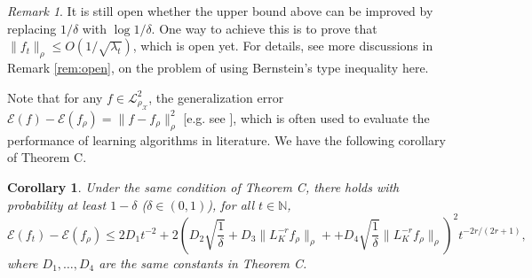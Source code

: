 \documentclass[twoside,11pt]{amsart}
\theoremstyle{theorem}
\newtheorem{cor}[thm]{Corollary}
\theoremstyle{definition}
\theoremstyle{remark}
\newtheorem{rem}[thm]{Remark}
\def\L{{\mathscr L}}
\def\L2{{\mathscr L}^2_{\rho_\X}}
\def\X{{\mathscr X}}
\def\Err{{\mathscr E}}
\def\N{{\mathbb N}}
\def\la{\lambda}
\begin{document}
\begin{rem}
It is still open whether the upper bound above can be improved by replacing $1/\delta$ with $\log 1/\delta$. One way to achieve this is to prove
that $\|f_t\|_\rho \leq O(1/\sqrt{\la_t})$, which is open yet. For details, see more discussions in Remark \ref{rem:open}, 
on the problem of using Bernstein's type inequality here.
\end{rem}

Note that for any $f\in \L2$, the generalization error $\Err(f) - \Err(f_\rho)=\|f - f_\rho \|_\rho^2$ [e.g. see ], 
which is often used to evaluate the performance of learning algorithms in literature. We have the following corollary of Theorem C.

\begin{cor} \label{cor:C}
Under the same condition of Theorem C, there holds with probability at least $1-\delta$ ($\delta\in (0,1)$), for all $t\in \N$, 
\[ \Err(f_t) - \Err(f_\rho) \leq 2D_1 t^{-2} + 2(D_2 \sqrt{\frac{1}{\delta}} + D_3 \| L^{-r}_K f_\rho\|_\rho++D_4 \sqrt{\frac{1}{\delta}} \| L^{-r}_K f_\rho\|_\rho)^2 t^{-2r/(2r+1)}, \]
where $D_1,\ldots,D_4$ are the same constants in Theorem C. 
\end{cor}
\end{document}
